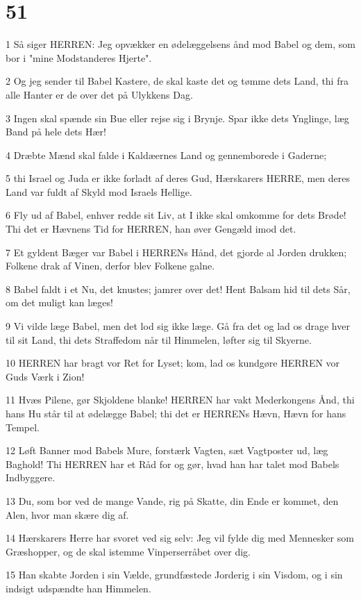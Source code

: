 \chapter{51}

\par 1 Så siger HERREN: Jeg opvækker en ødelæggelsens ånd mod Babel og dem, som bor i "mine Modstanderes Hjerte".
\par 2 Og jeg sender til Babel Kastere, de skal kaste det og tømme dets Land, thi fra alle Hanter er de over det på Ulykkens Dag.
\par 3 Ingen skal spænde sin Bue eller rejse sig i Brynje. Spar ikke dets Ynglinge, læg Band på hele dets Hær!
\par 4 Dræbte Mænd skal falde i Kaldæernes Land og gennemborede i Gaderne;
\par 5 thi Israel og Juda er ikke forladt af deres Gud, Hærskarers HERRE, men deres Land var fuldt af Skyld mod Israels Hellige.
\par 6 Fly ud af Babel, enhver redde sit Liv, at I ikke skal omkomme for dets Brøde! Thi det er Hævnens Tid for HERREN, han øver Gengæld imod det.
\par 7 Et gyldent Bæger var Babel i HERRENs Hånd, det gjorde al Jorden drukken; Folkene drak af Vinen, derfor blev Folkene galne.
\par 8 Babel faldt i et Nu, det knustes; jamrer over det! Hent Balsam hid til dets Sår, om det muligt kan læges!
\par 9 Vi vilde læge Babel, men det lod sig ikke læge. Gå fra det og lad os drage hver til sit Land, thi dets Straffedom når til Himmelen, løfter sig til Skyerne.
\par 10 HERREN har bragt vor Ret for Lyset; kom, lad os kundgøre HERREN vor Guds Værk i Zion!
\par 11 Hvæs Pilene, gør Skjoldene blanke! HERREN har vakt Mederkongens Ånd, thi hans Hu står til at ødelægge Babel; thi det er HERRENs Hævn, Hævn for hans Tempel.
\par 12 Løft Banner mod Babels Mure, forstærk Vagten, sæt Vagtposter ud, læg Baghold! Thi HERREN har et Råd for og gør, hvad han har talet mod Babels Indbyggere.
\par 13 Du, som bor ved de mange Vande, rig på Skatte, din Ende er kommet, den Alen, hvor man skære dig af.
\par 14 Hærskarers Herre har svoret ved sig selv: Jeg vil fylde dig med Mennesker som Græshopper, og de skal istemme Vinperserråbet over dig.
\par 15 Han skabte Jorden i sin Vælde, grundfæstede Jorderig i sin Visdom, og i sin indsigt udspændte han Himmelen.
